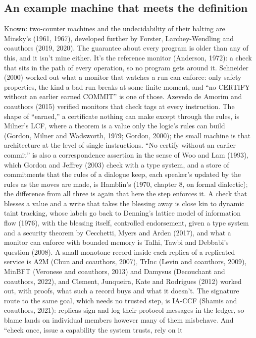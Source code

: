 \documentclass[11pt,twoside]{article}
\theoremstyle{thielethm}
\theoremstyle{thieledef}
\theoremstyle{thieledef}
\theoremstyle{thieledef}
\theoremstyle{thielethm}
\theoremstyle{thieleobs}
\theoremstyle{thielethm}
\begin{document}
\subsection{An example machine that meets the definition}

Known: two-counter machines and the undecidability of their halting are Minsky's (1961, 1967),
developed further by Forster, Larchey-Wendling and coauthors (2019, 2020). The guarantee about every program is older than any of this, and it
isn't mine either. It's the reference monitor (Anderson, 1972): a check that sits in the path of
every operation, so no program gets around it. Schneider (2000) worked out what a monitor that
watches a run can enforce: only safety properties, the kind a bad run breaks at some finite
moment, and ``no CERTIFY without an earlier earned COMMIT'' is one of those. Azevedo de Amorim
and coauthors (2015) verified monitors that check tags at every instruction. The shape
of ``earned,'' a certificate nothing can make except through the rules, is Milner's LCF, where a
theorem is a value only the logic's rules can build (Gordon, Milner and Wadsworth, 1979; Gordon,
2000); the small machine is that architecture at the level of single instructions. ``No certify
without an earlier commit'' is also a correspondence assertion in the sense of Woo and Lam
(1993), which Gordon and Jeffrey (2003) check with a type system, and a store of commitments
that the rules of a dialogue keep, each speaker's updated by the rules as the moves are made, is
Hamblin's (1970, chapter 8, on formal dialectic); the difference from all three is
again that here the step enforces it. A check that
blesses a value and a write that takes the blessing away is close kin to dynamic taint tracking,
whose labels go back to Denning's lattice model of information flow (1976), with the blessing
itself, controlled endorsement, given a type system and a security theorem by Cecchetti, Myers
and Arden (2017), and what a monitor
can enforce with bounded memory is Talhi, Tawbi and Debbabi's question (2008). A small monotone
record inside each replica of a replicated service is A2M (Chun and coauthors, 2007), TrInc
(Levin and coauthors, 2009), MinBFT (Veronese and coauthors, 2013) and Damysus (Decouchant and
coauthors, 2022), and Clement, Junqueira, Kate and Rodrigues (2012) worked out, with proofs, what such a record
buys and what it doesn't. The signature route to the same goal, which needs no trusted step,
is IA-CCF (Shamis and coauthors, 2021): replicas sign and log their protocol messages in the
ledger, so blame lands on individual members however many of them misbehave. And ``check once, issue a capability the system trusts, rely on it
\end{document}
